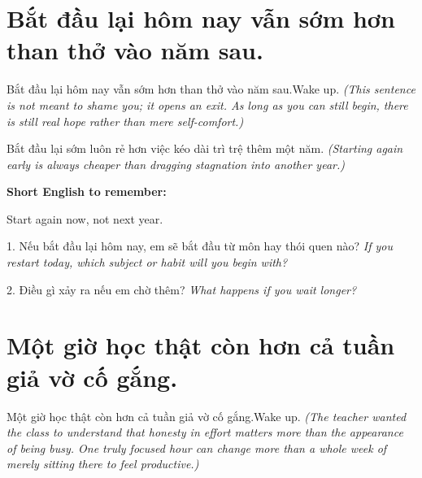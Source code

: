 \section{Bắt đầu lại hôm nay vẫn sớm hơn than thở vào năm sau.}
\begin{truyen}{Bắt đầu lại hôm nay vẫn sớm hơn than thở vào năm sau.}{Wake up.}
\textit{(This sentence is not meant to shame you; it opens an exit. As long as you can still begin, there is still real hope rather than mere self-comfort.)}
\end{truyen}

\begin{baihoc}
Bắt đầu lại sớm luôn rẻ hơn việc kéo dài trì trệ thêm một năm.
\textit{(Starting again early is always cheaper than dragging stagnation into another year.)}
\end{baihoc}

\begin{ghinhoanh}
\textbf{Short English to remember:}

Start again now, not next year.

\end{ghinhoanh}

\begin{tuhocnhanh}
1. Nếu bắt đầu lại hôm nay, em sẽ bắt đầu từ môn hay thói quen nào? \textit{If you restart today, which subject or habit will you begin with?}

2. Điều gì xảy ra nếu em chờ thêm? \textit{What happens if you wait longer?}
\end{tuhocnhanh}
\ngancach

\section{Một giờ học thật còn hơn cả tuần giả vờ cố gắng.}
\begin{truyen}{Một giờ học thật còn hơn cả tuần giả vờ cố gắng.}{Wake up.}
\textit{(The teacher wanted the class to understand that honesty in effort matters more than the appearance of being busy. One truly focused hour can change more than a whole week of merely sitting there to feel productive.)}
\end{truyen}

